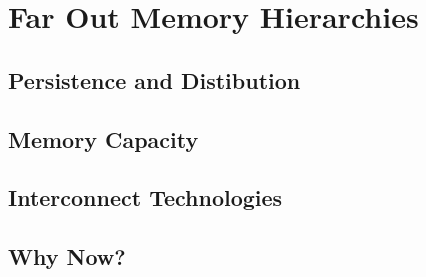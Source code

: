 \chapter{Far Out Memory Hierarchies}\label{ch:farout}

\section{Persistence and Distibution}

\section{Memory Capacity}

\section{Interconnect Technologies}

\section{Why Now?}
